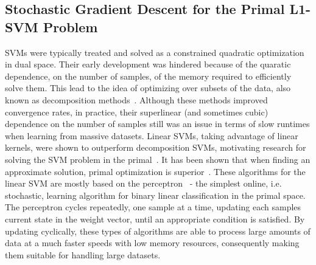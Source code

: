\documentclass[reqno]{vcuthesis}
\numberwithin{equation}{chapter}
\begin{document}
\subsection{Stochastic Gradient Descent for the Primal L1-SVM Problem}
SVMs were typically treated and solved as a constrained quadratic optimization in dual space. Their early development was hindered because of the quaratic dependence, on the number of samples, of the memory required to efficiently solve them. This lead to the idea of optimizing over subsets of the data, also known as decomposition methods~\cite{boser1992training,Joachims1999,keerthi2001improvements,Platt1998}. Although these methods improved convergence rates, in practice, their superlinear (and sometimes cubic) dependence on the number of samples still was an issue in terms of slow runtimes when learning from massive datasets. Linear SVMs, taking advantage of linear kernels, were shown to outperform decomposition SVMs, motivating research for solving the SVM problem in the primal~\cite{Chapelle2007,panagiotakopoulos2013stochastic}. It has been shown that when finding an approximate solution, primal optimization is superior~\cite{Chapelle2007}. These algorithms for the linear SVM are mostly based on the perceptron~\cite{freund1999large,rosenblatt1958perceptron} - the simplest online, i.e. stochastic, learning algorithm for binary linear classification in the primal space. The perceptron cycles repeatedly, one sample at a time, updating each samples current state in the weight vector, until an appropriate condition is satisfied. By updating cyclically, these types of algorithms are able to process large amounts of data at a much faster speeds with low memory resources, consequently making them suitable for handling large datasets. 
\end{document}

